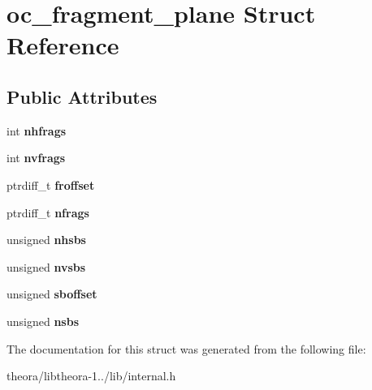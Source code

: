 \hypertarget{structoc__fragment__plane}{\section{oc\+\_\+fragment\+\_\+plane Struct Reference}
\label{structoc__fragment__plane}
}
\subsection*{Public Attributes}
\begin{DoxyCompactItemize}
\item 
\hypertarget{structoc__fragment__plane_afe7cfc8dacaa136be90ae442f0898bfe}{int {\bfseries nhfrags}}\label{structoc__fragment__plane_afe7cfc8dacaa136be90ae442f0898bfe}

\item 
\hypertarget{structoc__fragment__plane_a74b3f116afcd884d5a2547799d682364}{int {\bfseries nvfrags}}\label{structoc__fragment__plane_a74b3f116afcd884d5a2547799d682364}

\item 
\hypertarget{structoc__fragment__plane_a7795fc5aab08c3042d7accd3b0680555}{ptrdiff\+\_\+t {\bfseries froffset}}\label{structoc__fragment__plane_a7795fc5aab08c3042d7accd3b0680555}

\item 
\hypertarget{structoc__fragment__plane_abd683d80900616e9ca4c252f7a8ace99}{ptrdiff\+\_\+t {\bfseries nfrags}}\label{structoc__fragment__plane_abd683d80900616e9ca4c252f7a8ace99}

\item 
\hypertarget{structoc__fragment__plane_ac3c4006692cbe3166da10ad2ad4065aa}{unsigned {\bfseries nhsbs}}\label{structoc__fragment__plane_ac3c4006692cbe3166da10ad2ad4065aa}

\item 
\hypertarget{structoc__fragment__plane_a6d770e6f0319db3ed05cb90bbc93eb24}{unsigned {\bfseries nvsbs}}\label{structoc__fragment__plane_a6d770e6f0319db3ed05cb90bbc93eb24}

\item 
\hypertarget{structoc__fragment__plane_a070b11b47663d4415e02f3f8c94753e3}{unsigned {\bfseries sboffset}}\label{structoc__fragment__plane_a070b11b47663d4415e02f3f8c94753e3}

\item 
\hypertarget{structoc__fragment__plane_a8de5a104520e975ec8b3f84d9e62dab2}{unsigned {\bfseries nsbs}}\label{structoc__fragment__plane_a8de5a104520e975ec8b3f84d9e62dab2}

\end{DoxyCompactItemize}


The documentation for this struct was generated from the following file\+:\begin{DoxyCompactItemize}
\item 
theora/libtheora-\/1../lib/internal.\+h\end{DoxyCompactItemize}
